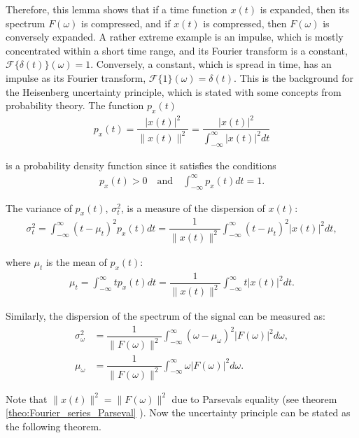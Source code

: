 Therefore, this lemma shows that if a time function $x(t)$ is expanded, then its spectrum $F(\omega)$ is compressed, and if $x(t)$ is compressed, then $F(\omega)$ is conversely expanded. A rather extreme example is an impulse, which is mostly concentrated within a short time range, and its Fourier transform is a constant, $\mathcal{F}\{\delta(t)\}(\omega) = 1$. Conversely, a constant, which is spread in time, has an impulse as its Fourier transform, $\mathcal{F}\{1\}(\omega) = \delta(t)$. This is the background for the Heisenberg uncertainty principle, which is stated with some concepts from probability theory. The function $p_x(t)$
\begin{align*}
p_x(t) = \dfrac{|x(t)|^2}{\|x(t)\|^2} = \dfrac{|x(t)|^2}{\int_{-\infty}^\infty |x(t)|^2 dt}
\end{align*}

is a probability density function since it satisfies the conditions
\begin{align*}
p_x(t) > 0 \quad \text{and} \quad \int_{-\infty}^\infty p_x(t) dt = 1.
\end{align*}

The variance of $p_x(t)$, $\sigma_t^2$, is a measure of the dispersion of $x(t)$:
\begin{align*}
\sigma_t^2 = \int_{-\infty}^\infty (t - \mu_t)^2 p_x(t) dt = \dfrac{1}{\|x(t)\|^2} \int_{-\infty}^\infty (t - \mu_t)^2 |x(t)|^2 dt,
\end{align*}

where $\mu_t$ is the mean of $p_x(t)$:
\begin{align*}
\mu_t = \int_{-\infty}^\infty t p_x(t) dt = \dfrac{1}{\|x(t)\|^2} \int_{-\infty}^\infty t |x(t)|^2 dt.
\end{align*}

Similarly, the dispersion of the spectrum of the signal can be measured as:
\begin{align*}
\sigma_\omega^2 &= \dfrac{1}{\|F(\omega)\|^2} \int_{-\infty}^\infty (\omega - \mu_\omega)^2 |F(\omega)|^2 d\omega, \\
\mu_\omega &= \dfrac{1}{\|F(\omega)\|^2} \int_{-\infty}^\infty \omega |F(\omega)|^2 d\omega.
\end{align*}

Note that $\|x(t)\|^2 = \|F(\omega)\|^2$ due to Parsevals equality (see theorem \ref{theo:Fourier_series_Parseval} ). Now the uncertainty principle can be stated as the following theorem.

